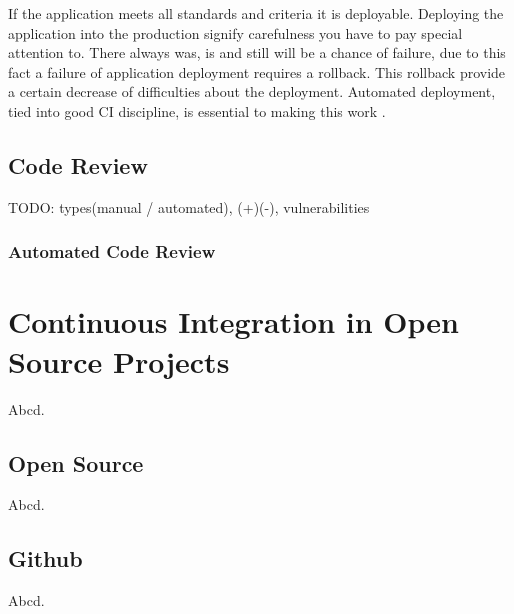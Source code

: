 If the application meets all standards and criteria it is deployable. Deploying the application into the production signify carefulness you have to pay special attention to. There always was, is and still will be a chance of failure, due to this fact a failure of application deployment requires a rollback. This rollback provide a certain decrease of difficulties about the deployment. Automated deployment, tied into good CI discipline, is essential to making this work \cite{MartinFowler}.

\section{Code Review}

{\color{red}TODO: types(manual / automated), (+)(-), vulnerabilities}

\subsection{Automated Code Review}

\chapter{Continuous Integration in Open Source Projects}

Abcd.

\section{Open Source}

Abcd.

\section{Github}

Abcd.

